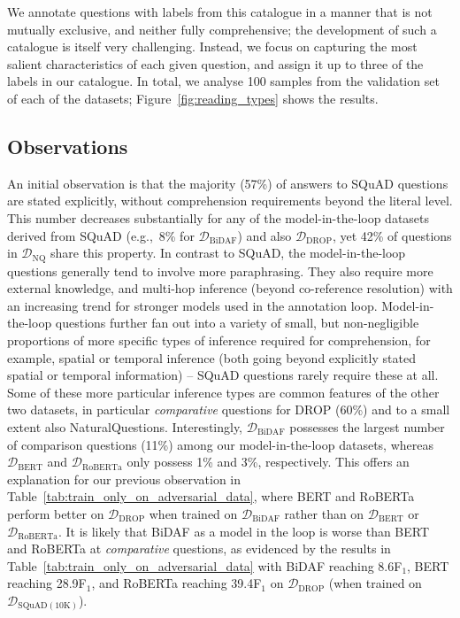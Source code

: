 \documentclass[11pt,a4paper]{article}
\newcommand{\dataset}[1]{\ensuremath{\mathcal{D_{\mathrm{#1}}}}}
\newcommand{\squad}{SQuAD}
\newcommand{\drop}{DROP}
\newcommand{\naturalquestions}{NaturalQuestions}
\begin{document}
We annotate questions with labels from this catalogue in a manner that is not mutually exclusive, and neither fully comprehensive; the development of such a catalogue is itself very challenging.
Instead, we focus on capturing the most salient characteristics of each given question, and assign it up to three of the labels in our catalogue.
In total, we analyse 100 samples from the validation set of each of the datasets; Figure~\ref{fig:reading_types} shows the results.



\subsection{Observations}

An initial observation is that the majority (57\%) of answers to \squad{} questions are stated explicitly, without comprehension requirements beyond the literal level.
This number decreases substantially for any of the model-in-the-loop datasets derived from \squad{} (e.g.,~8\% for \dataset{BiDAF}) and also \dataset{DROP}, yet 42\% of questions in \dataset{NQ} share this property.
In contrast to \squad{}, the model-in-the-loop questions generally tend to involve more paraphrasing.
They also require more external knowledge, and multi-hop inference (beyond co-reference resolution) with an increasing trend for stronger models used in the annotation loop.
Model-in-the-loop questions further fan out into a variety of small, but non-negligible proportions of more specific types of inference required for comprehension, for example, spatial or temporal inference (both going beyond explicitly stated spatial or temporal information) -- \squad{} questions rarely require these at all.
Some of these more particular inference types are common features of the other two datasets, in particular \emph{comparative} questions for \drop{} (60\%) and to a small extent also \naturalquestions{}.
Interestingly, \dataset{BiDAF} possesses the largest number of comparison questions (11\%) among our model-in-the-loop datasets, whereas \dataset{BERT} and \dataset{RoBERTa} only possess 1\% and 3\%, respectively.
This offers an explanation for our previous observation in Table~\ref{tab:train_only_on_adversarial_data}, where BERT and RoBERTa perform better on \dataset{DROP} when trained on \dataset{BiDAF} rather than on \dataset{BERT} or \dataset{RoBERTa}.
It is likely that BiDAF as a model in the loop is worse than BERT and RoBERTa at \emph{comparative} questions, as evidenced by the results in Table~\ref{tab:train_only_on_adversarial_data} with BiDAF reaching 8.6F$_\text{1}$, BERT reaching 28.9F$_\text{1}$, and RoBERTa reaching 39.4F$_\text{1}$ on \dataset{DROP} (when trained on \dataset{SQuAD(10K)}).
\end{document}
